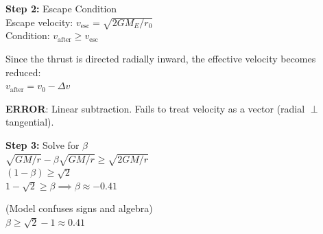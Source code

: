 \begin{minipage}[t!]{\linewidth}
\begin{tcolorbox}[
        title={\textbf{IPhO 2005 Q1}},
        colback=white,
        colframe=gray!50!black,
        arc=3pt,
        boxrule=1pt,
        fonttitle=\sffamily\large,
        width=\linewidth
    ]
\begin{minipage}[t]{0.49\linewidth}
\begin{tcolorbox}
                \textbf{\textcolor{blue!60!black}{Step 2:}} Escape Condition\\
                Escape velocity: $v_{\text{esc}} = \sqrt{2GM_E / r_0}$\\
                Condition: $v_{\text{after}} \geq v_{\text{esc}}$
                \vspace{0.5em}
                
                Since the thrust is directed radially inward, the effective velocity becomes reduced:\\
                $v_{\text{after}} = v_0 - \Delta v$
                
                \vspace{0.3em}
                \colorbox{red!15}{\parbox{\linewidth}{\textcolor{red!80!black}{\textbf{ERROR}: Linear subtraction. Fails to treat velocity as a vector (radial $\perp$ tangential).}}}
                \vspace{0.3em}
                
                \textbf{\textcolor{blue!60!black}{Step 3:}} Solve for $\beta$\\
                $\sqrt{GM/r} - \beta \sqrt{GM/r} \geq \sqrt{2GM/r}$\\
                $(1 - \beta) \geq \sqrt{2}$\\
                $1 - \sqrt{2} \geq \beta \implies \beta \approx -0.41$
                \vspace{0.5em}
                
                (Model confuses signs and algebra)\\
                $\beta \geq \sqrt{2} - 1 \approx 0.41$
                \vspace{1em}
                

\end{tcolorbox}
\end{minipage}
\end{tcolorbox}
\end{minipage}
